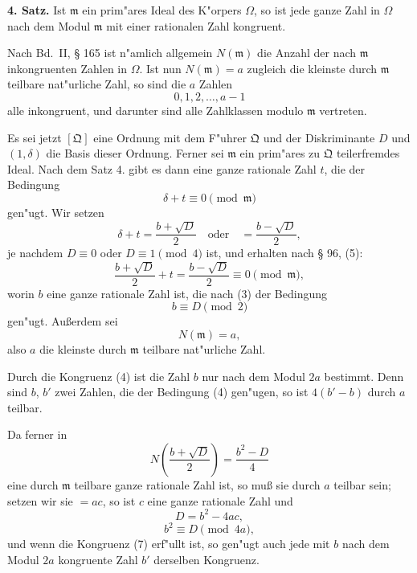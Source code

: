 \documentclass[12pt,a4paper]{article}
\theoremstyle{plain}
\begin{document}
\textbf{4. Satz.} Ist $\mathfrak{m}$ ein prim"ares Ideal des K"orpers $\Omega$, so ist jede ganze Zahl in $\Omega$ nach dem Modul $\mathfrak{m}$ mit einer rationalen Zahl kongruent.

Nach Bd.~II, \S{} 165 ist n"amlich allgemein $N(\mathfrak{m})$ die Anzahl der nach $\mathfrak{m}$ inkongruenten Zahlen in $\Omega$. Ist nun $N(\mathfrak{m}) = a$ zugleich die kleinste durch $\mathfrak{m}$ teilbare nat"urliche Zahl, so sind die $a$ Zahlen
\[
0, 1, 2, \ldots, a-1
\]
alle inkongruent, und darunter sind alle Zahlklassen modulo $\mathfrak{m}$ vertreten.

Es sei jetzt $[\mathfrak{Q}]$ eine Ordnung mit dem F"uhrer $\mathfrak{Q}$ und der Diskriminante $D$ und $(1, \delta)$ die Basis dieser Ordnung. Ferner sei $\mathfrak{m}$ ein prim"ares zu $\mathfrak{Q}$ teilerfremdes Ideal. Nach dem Satz 4. gibt es dann eine ganze rationale Zahl $t$, die der Bedingung
\[
\delta + t \equiv 0 \pmod{\mathfrak{m}}
\]
gen"ugt. Wir setzen
\begin{equation}
\delta + t = \frac{b + \sqrt{D}}{2}\quad \text{oder}\quad = \frac{b - \sqrt{D}}{2},
\tag{3}
\end{equation}
je nachdem $D \equiv 0$ oder $D \equiv 1 \pmod{4}$ ist, und erhalten nach \S{} 96, (5):
\begin{equation}
\frac{b + \sqrt{D}}{2} + t = \frac{b - \sqrt{D}}{2} \equiv 0 \pmod{\mathfrak{m}},
\tag{4}
\end{equation}
worin $b$ eine ganze rationale Zahl ist, die nach (3) der Bedingung
\[
b \equiv D \pmod{2}
\]
gen"ugt. Au\ss erdem sei
\begin{equation}
N(\mathfrak{m}) = a,
\tag{5}
\end{equation}
also $a$ die kleinste durch $\mathfrak{m}$ teilbare nat"urliche Zahl.

Durch die Kongruenz (4) ist die Zahl $b$ nur nach dem Modul $2a$ bestimmt. Denn sind $b$, $b'$ zwei Zahlen, die der Bedingung (4) gen"ugen, so ist $4(b' - b)$ durch $a$ teilbar.

Da ferner in
\[
N\left(\frac{b + \sqrt{D}}{2}\right) = \frac{b^2 - D}{4}
\]
eine durch $\mathfrak{m}$ teilbare ganze rationale Zahl ist, so mu\ss{} sie durch $a$ teilbar sein; setzen wir sie $= ac$, so ist $c$ eine ganze rationale Zahl und
\begin{equation}
D = b^2 - 4ac,
\tag{6}
\end{equation}
\begin{equation}
b^2 \equiv D \pmod{4a},
\tag{7}
\end{equation}
und wenn die Kongruenz (7) erf"ullt ist, so gen"ugt auch jede mit $b$ nach dem Modul $2a$ kongruente Zahl $b'$ derselben Kongruenz.
\end{document}
